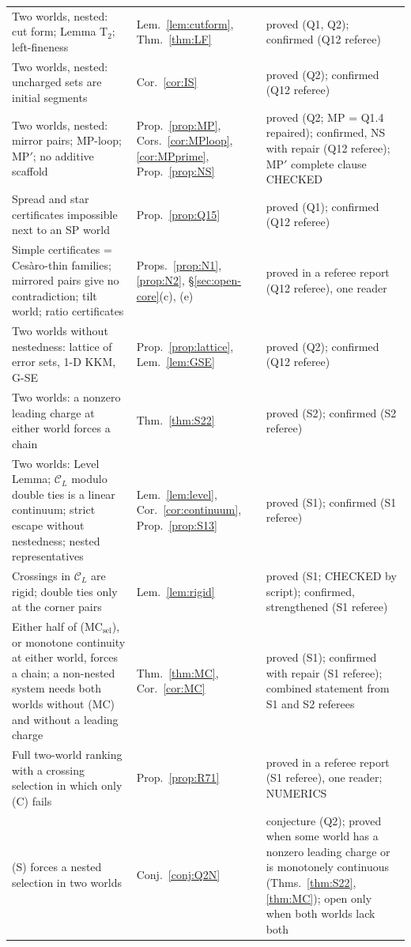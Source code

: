 \documentclass[11pt]{article}
\theoremstyle{definition}
\theoremstyle{remark}
\newcommand{\C}{\mathcal C}
\begin{document}
{\begin{longtable}{>{\raggedright\arraybackslash}p{6.4cm}>{\raggedright\arraybackslash}p{2.1cm}>{\raggedright\arraybackslash}p{5.6cm}}
Two worlds, nested: cut form; Lemma T$_2$; left-fineness & Lem.~\ref{lem:cutform}, Thm.~\ref{thm:LF} & proved (Q1, Q2); confirmed (Q12 referee)\\
Two worlds, nested: uncharged sets are initial segments & Cor.~\ref{cor:IS} & proved (Q2); confirmed (Q12 referee)\\
Two worlds, nested: mirror pairs; MP-loop; MP$'$; no additive scaffold & Prop.~\ref{prop:MP}, Cors.~\ref{cor:MPloop}, \ref{cor:MPprime}, Prop.~\ref{prop:NS} & proved (Q2; MP = Q1.4 repaired); confirmed, NS with repair (Q12 referee); MP$'$ complete clause CHECKED\\
Spread and star certificates impossible next to an SP world & Prop.~\ref{prop:Q15} & proved (Q1); confirmed (Q12 referee)\\
Simple certificates = Ces\`aro-thin families; mirrored pairs give no contradiction; tilt world; ratio certificates & Props.~\ref{prop:N1}, \ref{prop:N2}, \S\ref{sec:open-core}(c), (e) & proved in a referee report (Q12 referee), one reader\\
Two worlds without nestedness: lattice of error sets, 1-D KKM, G-SE & Prop.~\ref{prop:lattice}, Lem.~\ref{lem:GSE} & proved (Q2); confirmed (Q12 referee)\\
Two worlds: a nonzero leading charge at either world forces a chain & Thm.~\ref{thm:S22} & proved (S2); confirmed (S2 referee)\\
Two worlds: Level Lemma; $\C_L$ modulo double ties is a linear continuum; strict escape without nestedness; nested representatives & Lem.~\ref{lem:level}, Cor.~\ref{cor:continuum}, Prop.~\ref{prop:S13} & proved (S1); confirmed (S1 referee)\\
Crossings in $\C_L$ are rigid; double ties only at the corner pairs & Lem.~\ref{lem:rigid} & proved (S1; CHECKED by script); confirmed, strengthened (S1 referee)\\
Either half of (MC$_{\mathrm{sel}}$), or monotone continuity at either world, forces a chain; a non-nested system needs both worlds without (MC) and without a leading charge & Thm.~\ref{thm:MC}, Cor.~\ref{cor:MC} & proved (S1); confirmed with repair (S1 referee); combined statement from S1 and S2 referees\\
Full two-world ranking with a crossing selection in which only (C) fails & Prop.~\ref{prop:R71} & proved in a referee report (S1 referee), one reader; NUMERICS\\
(S) forces a nested selection in two worlds & Conj.~\ref{conj:Q2N} & conjecture (Q2); proved when some world has a nonzero leading charge or is monotonely continuous (Thms.~\ref{thm:S22}, \ref{thm:MC}); open only when both worlds lack both\\

\end{longtable}}
\end{document}
